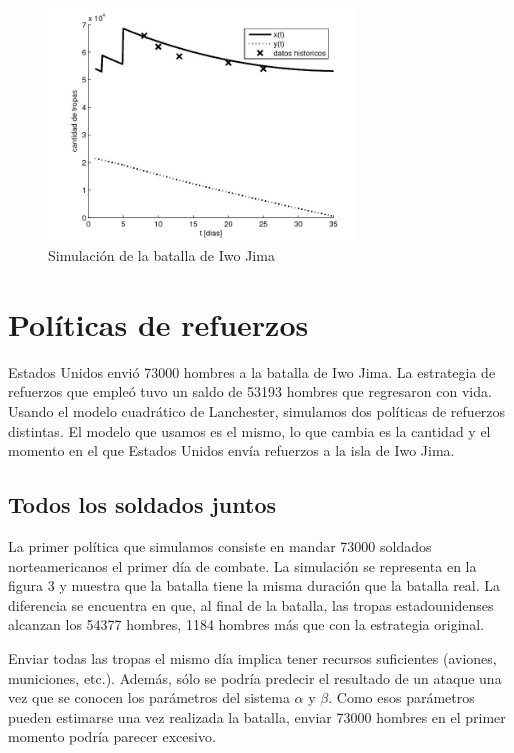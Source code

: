 \documentclass[10pt,journal,compsoc]{IEEEtran}
\begin{document}
\begin{figure}[t]
\label{fig:sim1}
\centering
\includegraphics[width=3.2in]{simulacro}
\caption{Simulaci\'on de la batalla de Iwo Jima}
\end{figure}

\section{Pol\'iticas de refuerzos}
\indent Estados Unidos envi\'o 73000 hombres a la batalla de Iwo Jima.  La estrategia de refuerzos que emple\'o tuvo un saldo de 53193 hombres
que regresaron con vida.
Usando el modelo cuadr\'atico de Lanchester, simulamos dos pol\'iticas de refuerzos distintas.  El modelo que usamos es el mismo, lo que cambia
es la cantidad y el momento en el que Estados Unidos env\'ia refuerzos a la isla de Iwo Jima.
\subsection{Todos los soldados juntos}
\indent La primer pol\'itica que simulamos consiste en mandar 73000 soldados norteamericanos el primer d\'ia de combate.
La simulaci\'on se representa en la figura 3 y muestra que la batalla tiene la misma duraci\'on que la batalla real. 
La diferencia se encuentra en que, al final de la batalla,
 las tropas estadounidenses alcanzan los 54377 hombres, 1184 hombres m\'as que con la estrategia original.  

Enviar todas las tropas el mismo d\'ia implica tener recursos suficientes (aviones, municiones, etc.).  Adem\'as, s\'olo se podr\'ia predecir
el resultado de un ataque una vez que se conocen los par\'ametros del sistema $\alpha$ y $\beta$.  Como esos par\'ametros pueden estimarse
una vez realizada la batalla, enviar 73000 hombres en el primer momento podr\'ia parecer excesivo.
 
\end{document}
